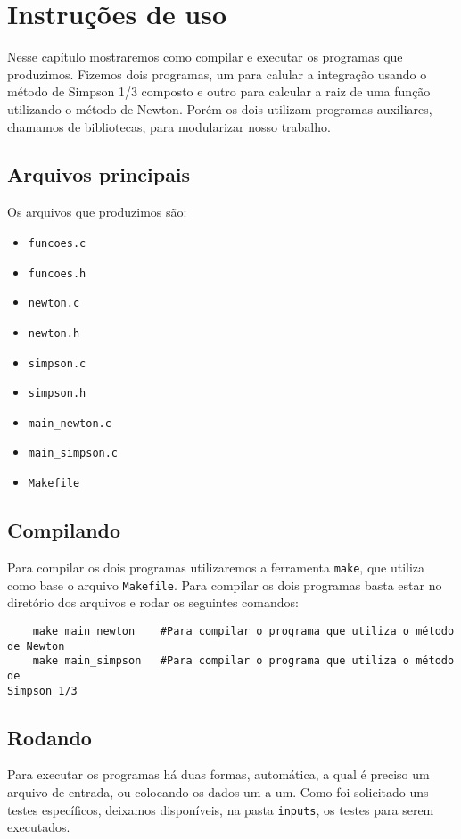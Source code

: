 \chapter{Instruções de uso}
Nesse capítulo mostraremos como compilar e executar os programas que produzimos.
Fizemos dois programas, um para calular a integração usando o método de Simpson
1/3 composto e outro para calcular a raiz de uma função utilizando o método de
Newton. Porém os dois utilizam programas auxiliares, chamamos de bibliotecas,
para modularizar nosso trabalho.

\section{Arquivos principais}
Os arquivos que produzimos são:
	\begin{itemize}
		\item \texttt{funcoes.c}
		\item \texttt{funcoes.h}
		\item \texttt{newton.c}
		\item \texttt{newton.h}
		\item \texttt{simpson.c}
		\item \texttt{simpson.h}
		\item \texttt{main\_newton.c}
		\item \texttt{main\_simpson.c}
		\item \texttt{Makefile}
	\end{itemize}

\section{Compilando}
Para compilar os dois programas utilizaremos a ferramenta \texttt{make}, que
utiliza como base o arquivo \texttt{Makefile}. Para compilar os dois programas
basta estar no diretório dos arquivos e rodar os seguintes comandos:

\begin{verbatim}
	make main_newton	#Para compilar o programa que utiliza o método de Newton
	make main_simpson	#Para compilar o programa que utiliza o método de
Simpson 1/3
\end{verbatim}

\section{Rodando}
Para executar os programas há duas formas, automática, a qual é preciso um
arquivo de entrada, ou colocando os dados um a um. Como foi solicitado uns
testes específicos, deixamos disponíveis, na pasta \texttt{inputs}, os testes
para serem executados.

